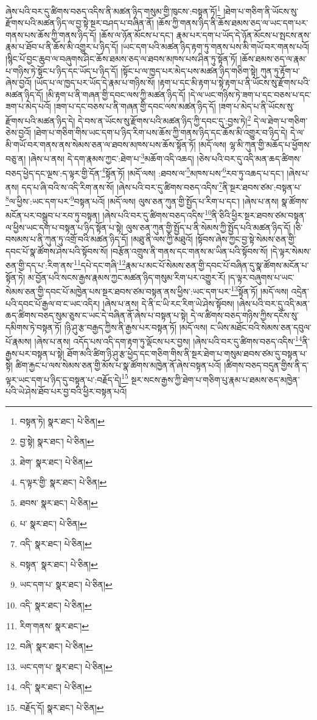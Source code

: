 ཞེས་པའི་བར་དུ་ཚིགས་བཅད་འདིས་ནི་མཚན་ཉིད་གསུམ་གྱི་ཁུངས་:བསྟན་ཏོ།\footnote{བསྟན་ཏེ།  སྣར་ཐང་།  པེ་ཅིན། } །ཐེག་པ་གཅིག་ནི་ཡོངས་སུ་རྫོགས་པའི་མཚན་ཉིད་ལ་བྱ་སྟེ་སྔར་བཤད་པ་བཞིན་ནོ། །ཆོས་ཀྱི་གནས་ཉིད་ནི་ཆོས་ཐམས་ཅད་ལ་ཡང་དག་པར་གནས་པས་ཆོས་ཀྱི་གནས་ཉིད་དོ། །ཆོས་ལ་ཉོན་མོངས་པ་དང་། རྣམ་པར་དག་པ་ཡོད་དེ་ཉོན་མོངས་པ་སྤངས་ནས་རྣམ་པ་ཐོབ་པ་ནི་ཆོས་མི་འགྱུར་པ་ཉིད་དོ། །ཡང་དག་པའི་མཚན་ཉིད་རྟག་ཏུ་གནས་པས་མི་གཡོ་བར་གནས་པའོ། །སྙིང་པོ་བྱང་ཆུབ་ལ་བཞུགས་ཤིང་ཆོས་ཐམས་ཅད་ལ་ཐབས་མཁས་པས་ཤིན་ཏུ་སྟོན་ཏོ། །ཆོས་ཐམས་ཅད་ལ་རྣམ་པ་གཉིས་ཏེ་སྟོང་པ་ཉིད་དང་ཡོད་པ་ཉིད་དོ། །སྟོང་པ་ལ་ཁྱད་པར་མེད་པས་མཚན་ཉིད་གཅིག་སྟེ། ཀུན་ཏུ་རྟོག་པ་ཞེས་བྱའོ། །ཡོད་པ་ལ་ཁྱད་པར་ཡོད་དེ་རྣམ་པ་གཉིས་སོ། །རྟག་པ་དང་མི་རྟག་པ་སྟེ་རྟག་པ་ནི་ཡོངས་སུ་རྫོགས་པའི་མཚན་ཉིད་དོ། །མི་རྟག་པ་ནི་གཞན་གྱི་དབང་ལས་ཀྱི་མཚན་ཉིད་དོ། །དེ་ལ་ཡང་གཉིས་ཏེ་ཟག་པ་དང་བཅས་པ་དང་ཟག་པ་མེད་པའོ། །ཟག་པ་དང་བཅས་པ་ནི་གཞན་གྱི་དབང་ལས་མཚན་ཉིད་དོ། །ཟག་པ་མེད་པ་ནི་ཡོངས་སུ་རྫོགས་པའི་མཚན་ཉིད་དེ། དེ་བས་ན་ཡོངས་སུ་རྫོགས་པའི་མཚན་ཉིད་ཀྱི་དབང་དུ་:བྱས་ཏེ།\footnote{བྱ་སྟེ།  སྣར་ཐང་།  པེ་ཅིན། } དེ་ལ་ཐེག་པ་གཅིག་ཅེས་བྱའོ། །ཐེག་པ་གཅིག་གིས་ཡང་དག་པ་ཉིད་རིག་པས་ཆོས་ཀྱི་གནས་ཉིད་དང་ཆོས་མི་འགྱུར་བ་ཉིད་དེ། དེ་ལ་མི་གཡོ་བར་གནས་ནས་སེམས་ཅན་ལ་ཐབས་མཁས་པས་ཆོས་སྟོན་ཏོ། །མདོ་ལས། ལྷ་མི་ཀུན་གྱི་མཆོད་པ་ཕྱོགས་བཅུ་ན། །ཞེས་པ་ནས། དེ་དག་རྣམས་ཀྱང་:ཐེག་པ་\footnote{ཐེག་  སྣར་ཐང་།  པེ་ཅིན། }མཆོག་འདི་འཆད། །ཅེས་པའི་བར་དུ་འདི་མན་ཆད་ཚིགས་བཅད་ཕྱེད་དང་ལྔས་:ད་ལྟར་གྱི་དོན་\footnote{ད་ལྟར་གྱི་  སྣར་ཐང་།  པེ་ཅིན། }སྟོན་ཏོ། །མདོ་ལས། :ཐབས་ལ་\footnote{ཐབས་  སྣར་ཐང་།  པེ་ཅིན། }མཁས་པས་\footnote{པ་  སྣར་ཐང་།  པེ་ཅིན། }རབ་ཏུ་འཆད་པ་དང་། །ཞེས་པ་ནས། དད་པ་ཞི་བའི་ས་འདི་རིག་ནས་སོ། །ཞེས་པའི་བར་དུ་ཚིགས་བཅད་འདིས་\footnote{འདི་  སྣར་ཐང་།  པེ་ཅིན། }ནི་སྔར་ཐབས་ཙམ་:བསྟན་པ་\footnote{བསྟན་  སྣར་ཐང་།  པེ་ཅིན། }ལ་ཕྱིས་:ཡང་དག་པར་\footnote{ཡང་དག་པ་  སྣར་ཐང་།  པེ་ཅིན། }བསྟན་པའོ། །མདོ་ལས། ལུས་ཅན་ཀུན་གྱི་སྤྱོད་པ་རིག་པ་དང་། །ཞེས་པ་ནས། སྣ་ཚོགས་མངོན་པར་བསྒྲུབ་པ་རབ་ཏུ་བསྟན། །ཞེས་པའི་བར་དུ་ཚིགས་བཅད་འདིས་\footnote{འདི་  སྣར་ཐང་།  པེ་ཅིན། }ནི་ཅིའི་ཕྱིར་སྔར་ཐབས་ཙམ་བསྟན་ལ་ཕྱིས་ཡང་དག་པ་བསྟན་པ་ཉིད་སྟོན་པ་སྟེ། ལུས་ཅན་ཀུན་གྱི་སྤྱོད་པ་ནི་སེམས་ཀྱི་སྤྱོད་པའི་མཚན་ཉིད་དོ། །ཅི་བསམས་པ་ནི་ཀུན་ཏུ་འགྲོ་བའི་མཚན་ཉིད་དོ། །མཐུ་ནི་ལས་ཀྱི་མཐུའོ། །སྟོབས་ཞེས་ཀྱང་བྱ་སྟེ་སེམས་ཅན་གྱི་དབང་པོ་སྣ་ཚོགས་ཤེས་པའི་སྟོབས་སོ། །བརྩོན་འགྲུས་ནི་གནས་དང་གནས་མ་ཡིན་པའི་སྟོབས་སོ། །དེ་ལྟར་སེམས་ཅན་གྱི་དད་པ་:རིག་ནས་\footnote{རིག་གནས་  སྣར་ཐང་། }དཔེ་དང་གཞི་\footnote{བཞི་  སྣར་ཐང་།  པེ་ཅིན། }རྣམ་པ་མང་པོ་སེམས་ཅན་གྱི་དབང་པོ་བཞིན་དུ་སྣ་ཚོགས་མངོན་པ་སྟོན་ཏེ། མ་བྱོན་པའི་སངས་རྒྱས་རྣམས་ཀྱང་མཚན་ཉིད་གསུམ་རིག་པར་འགྱུར་རོ། །ད་ལྟར་བཞུགས་པ་ཡང་སེམས་ཅན་གྱི་དབང་པོ་མཁྱེན་པས་སྔར་ཐབས་ཙམ་བསྟན་ནས་ཕྱིས་:ཡང་དག་པར་\footnote{ཡང་དག་པ་  སྣར་ཐང་།  པེ་ཅིན། }སྟོན་ཏོ། །མདོ་ལས། འདྲེན་པའི་དབང་པོ་རྒྱལ་བ་ང་ཡང་འདིར། །ཞེས་པ་ནས། དེ་ནི་ང་ཡི་རང་རིག་ཡེ་ཤེས་སྟོབས། །ཞེས་པའི་བར་དུ་འདི་མན་ཆད་ཚིགས་བཅད་སུམ་ཅུས་ང་ཡང་དེ་བཞིན་ནོ་ཞེས་པ་བསྟན་པ་སྟེ། དེ་ལ་ཚིགས་བཅད་གཉིས་ཀྱིས་དངོས་སུ་དམིགས་ཏེ་བསྟན་ཏོ། །ཉི་ཤུ་རྩ་བརྒྱད་ཀྱིས་ནི་རྒྱས་པར་བསྟན་ཏོ། །མདོ་ལས། ང་ཡིས་མཐོང་བའི་སེམས་ཅན་དབུལ་པོ་རྣམས། །ཞེས་པ་ནས། འདོད་པས་འདི་དག་རྟག་ཏུ་ལྡོངས་པར་བྱས། །ཞེས་པའི་བར་དུ་ཚིགས་བཅད་འདིས་\footnote{འདི་  སྣར་ཐང་།  པེ་ཅིན། }ནི་རྒྱས་པར་བསྟན་པ་སྟེ། ཐོག་མའི་ཚིག་ཉི་ཤུ་རྩ་ཕྱེད་དང་གཅིག་གིས་ནི་སྔར་ཐེག་པ་གསུམ་ཐབས་ཙམ་དུ་བསྟན་པ་སྟེ། ཚིག་རྐྱང་པ་ལས་སེམས་ཅན་གྱི་མོས་པ་སྣ་ཚོགས་མཁྱེན་ནོ་ཞེས་བསྟན་པའོ། །ཚིགས་བཅད་བདུན་གྱིས་ནི་ད་ལྟར་ཡང་དག་པ་ཉིད་དུ་བསྟན་པ་:བརྗོད་དེ།\footnote{བརྗོད་དོ།  སྣར་ཐང་།  པེ་ཅིན། } སྔར་སངས་རྒྱས་ཀྱི་ཐེག་པ་གཅིག་པུ་རྣམ་པ་ཐམས་ཅད་མཁྱེན་པའི་ཡེ་ཤེས་ཐོབ་པར་བྱ་བའི་ཕྱིར་བསྟན་པའོ། 